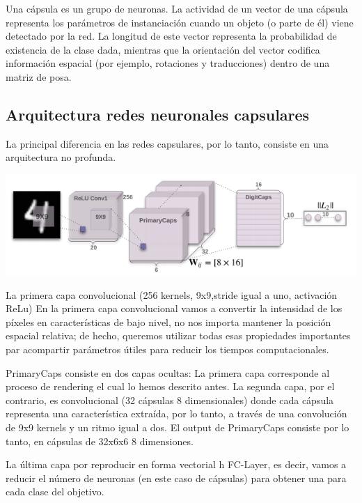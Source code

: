 \documentclass[12pt, man, donotrepeattitle, letterpaper]{apa6}
\begin{document}
    Una cápsula es un grupo de neuronas. La actividad de un vector de una cápsula representa los parámetros de instanciación cuando un objeto (o parte de él) viene detectado por la red. La longitud de este vector representa la probabilidad de existencia de la clase dada, mientras que la orientación del vector codifica información espacial (por ejemplo, rotaciones y traducciones) dentro de una matriz de posa.
    
    \subsection{Arquitectura redes neuronales capsulares}
    La principal diferencia en las redes capsulares, por lo tanto, consiste en una arquitectura no profunda.
    
    \begin{center}
        \begin{minipage}{0.6\linewidth}
            \includegraphics[width=\linewidth]{images/capsules}
        \end{minipage}
    \end{center}

    La primera capa convolucional (256 kernels, 9x9,stride igual a uno, activación ReLu)
    En la primera capa convolucional vamos a convertir la intensidad de los píxeles en características de bajo nivel, no nos importa mantener la posición espacial relativa; de hecho, queremos utilizar todas esas propiedades importantes par acompartir parámetros útiles para reducir los tiempos computacionales.

    PrimaryCaps consiste en dos capas ocultas: La primera capa corresponde al proceso de rendering el cual lo hemos descrito antes. La segunda capa, por el contrario, es convolucional (32 cápsulas 8 dimensionales) donde cada cápsula representa una característica extraída, por lo tanto, a través de una convolución de 9x9 kernels y un ritmo igual a dos. El output de PrimaryCaps consiste por lo tanto, en cápsulas de 32x6x6 8 dimensiones.

    La última capa por reproducir en forma vectorial h FC-Layer, es decir, vamos a reducir el número de neuronas (en este caso de cápsulas) para obtener una para cada clase del objetivo\parencite{Capsules4}.
\end{document}

